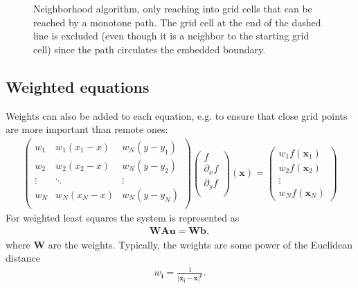 \documentclass[letterpaper,10pt,english]{sphinxmanual}
\let\sphinxpxdimen\pdfpxdimen\else\newdimen\sphinxpxdimen
\begin{document}
\begin{figure}[htb]
\centering
\capstart

\noindent\sphinxincludegraphics[width=480\sphinxpxdimen]{{MonotonePath}.png}
\caption{Neighborhood algorithm, only reaching into grid cells that can be reached by a monotone path. The grid cell at the end of the dashed line is excluded (even though it is a neighbor to the starting grid cell) since the path circulates the embedded boundary.}\label{\detokenize{Utilities/LeastSquares:id1}}\label{\detokenize{Utilities/LeastSquares:monotonepath}}\end{figure}


\subsection{Weighted equations}
\label{\detokenize{Utilities/LeastSquares:weighted-equations}}
Weights can also be added to each equation, e.g. to ensure that close grid points are more important than remote ones:
\begin{equation*}
\begin{split}\begin{pmatrix}
w_1 & w_1(x_1 - x) & w_N(y - y_1) \\
w_2 & w_2(x_2 - x) & w_N(y - y_2) \\
\vdots & \ddots & \vdots \\
w_N & w_N(x_N - x) & w_N(y - y_N) \\
\end{pmatrix}
\begin{pmatrix}
f            \\
\partial_x f \\
\partial_y f \\
\end{pmatrix}(\mathbf{x})
=
\begin{pmatrix}
w_1f(\mathbf{x}_1) \\
w_2f(\mathbf{x}_2) \\
\vdots \\
w_Nf(\mathbf{x}_N)
\end{pmatrix}\end{split}
\end{equation*}
For weighted least squares the system is represented as
\begin{equation*}
\begin{split}\mathbf{W}\mathbf{A}\mathbf{u} = \mathbf{W}\mathbf{b},\end{split}
\end{equation*}
where \(\mathbf{W}\) are the weights.
Typically, the weights are some power of the Euclidean distance
\begin{equation*}
\begin{split}w_{\mathbf{i}} = \frac{1}{\left|\mathbf{x}_{\mathbf{i}} - \mathbf{x}\right|^p}.\end{split}
\end{equation*}
\end{document}

